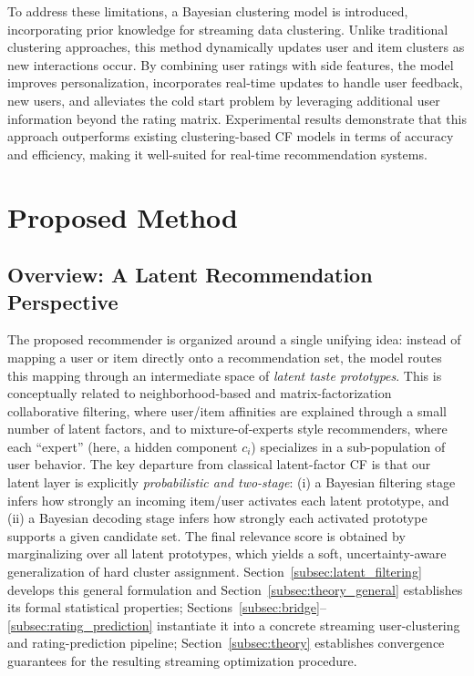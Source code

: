 \documentclass{article}
\theoremstyle{plain}
\theoremstyle{definition}
\theoremstyle{remark}
\begin{document}
To address these limitations, a Bayesian clustering model is introduced, incorporating prior knowledge for streaming data clustering. Unlike traditional clustering approaches, this method dynamically updates user and item clusters as new interactions occur. By combining user ratings with side features, the model improves personalization, incorporates real-time updates to handle user feedback, new users, and alleviates the cold start problem by leveraging additional user information beyond the rating matrix. Experimental results demonstrate that this approach outperforms existing clustering-based CF models in terms of accuracy and efficiency, making it well-suited for real-time recommendation systems. 























\section{Proposed Method}
\label{sec:proposed_method}

\subsection{Overview: A Latent Recommendation Perspective}
\label{subsec:overview}

The proposed recommender is organized around a single unifying idea: instead of mapping a user or item directly onto a recommendation set, the model routes this mapping through an intermediate space of \emph{latent taste prototypes}. This is conceptually related to neighborhood-based and matrix-factorization collaborative filtering, where user/item affinities are explained through a small number of latent factors, and to mixture-of-experts style recommenders, where each ``expert'' (here, a hidden component $c_i$) specializes in a sub-population of user behavior. The key departure from classical latent-factor CF is that our latent layer is explicitly \emph{probabilistic and two-stage}: (i) a Bayesian filtering stage infers how strongly an incoming item/user activates each latent prototype, and (ii) a Bayesian decoding stage infers how strongly each activated prototype supports a given candidate set. The final relevance score is obtained by marginalizing over all latent prototypes, which yields a soft, uncertainty-aware generalization of hard cluster assignment. Section~\ref{subsec:latent_filtering} develops this general formulation and Section~\ref{subsec:theory_general} establishes its formal statistical properties; Sections~\ref{subsec:bridge}--\ref{subsec:rating_prediction} instantiate it into a concrete streaming user-clustering and rating-prediction pipeline; Section~\ref{subsec:theory} establishes convergence guarantees for the resulting streaming optimization procedure.
\end{document}
